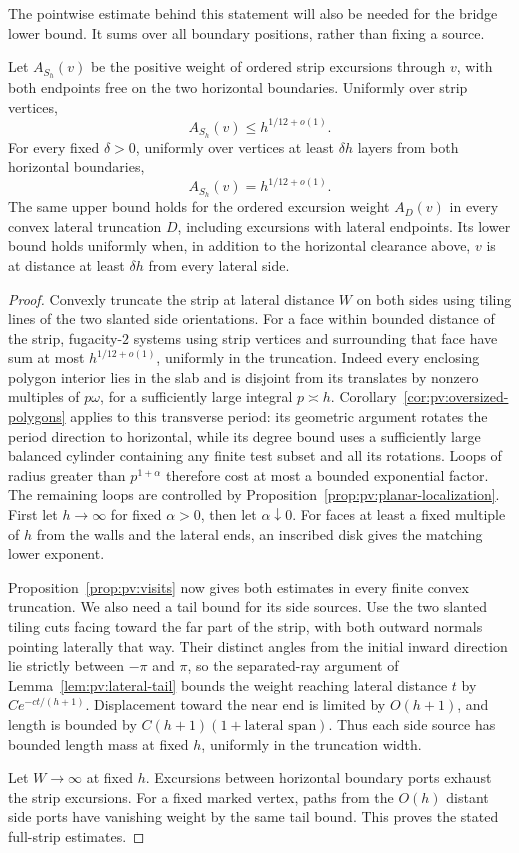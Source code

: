 The pointwise estimate behind this statement will also be needed for the
bridge lower bound. It sums over all boundary positions, rather than
fixing a source.

\begin{lemma}\label{lem:pv:strip-visits}
Let $A_{S_h}(v)$ be the positive weight of ordered strip excursions
through $v$, with both endpoints free on the two horizontal boundaries.
Uniformly over strip vertices,
\[
 A_{S_h}(v)\le h^{1/12+o(1)}.
\]
For every fixed $\delta>0$, uniformly over vertices at least
$\delta h$ layers from both horizontal boundaries,
\[
 A_{S_h}(v)=h^{1/12+o(1)}.
\]
The same upper bound holds for the ordered excursion weight $A_D(v)$
in every convex lateral truncation $D$, including excursions with
lateral endpoints. Its lower bound holds uniformly when, in addition
to the horizontal clearance above, $v$ is at distance at least
$\delta h$ from every lateral side.
\end{lemma}

\begin{proof}
Convexly truncate the strip at lateral distance $W$ on both sides using
tiling lines of the two slanted side orientations. For a face within
bounded distance of the strip, fugacity-$2$ systems using strip vertices
and surrounding that face have sum at most $h^{1/12+o(1)}$, uniformly in
the truncation. Indeed every enclosing polygon interior lies in the
slab and is disjoint from its translates by nonzero multiples of
$p\omega$, for a sufficiently large integral $p\asymp h$.
Corollary~\ref{cor:pv:oversized-polygons} applies to this transverse
period: its geometric argument rotates the period direction to
horizontal, while its degree bound uses a sufficiently large balanced
cylinder containing any finite test subset and all its rotations. Loops of
radius greater than $p^{1+\alpha}$ therefore cost at most a bounded
exponential factor. The remaining loops are controlled by
Proposition~\ref{prop:pv:planar-localization}. First let $h\to\infty$
for fixed $\alpha>0$, then let
$\alpha\downarrow0$. For faces at least a fixed multiple of $h$ from
the walls and the lateral ends, an inscribed disk gives the matching lower
exponent.

Proposition~\ref{prop:pv:visits} now gives both estimates in every
finite convex truncation. We also need a tail bound for its side
sources. Use the two slanted tiling cuts facing toward the far part of
the strip, with both outward normals pointing laterally that way.
Their distinct angles from the initial inward direction lie strictly
between $-\pi$ and $\pi$, so the separated-ray argument of
Lemma~\ref{lem:pv:lateral-tail} bounds the weight reaching lateral
distance $t$ by $Ce^{-ct/(h+1)}$. Displacement toward the near end is
limited by $O(h+1)$, and length is bounded by
$C(h+1)(1+\text{lateral span})$. Thus each side source has bounded
length mass at fixed $h$, uniformly in the truncation width.

Let $W\to\infty$ at fixed $h$. Excursions between horizontal boundary
ports exhaust the strip excursions. For a fixed marked vertex, paths
from the $O(h)$ distant side ports have vanishing weight by the same
tail bound. This proves the stated full-strip estimates.
\end{proof}

